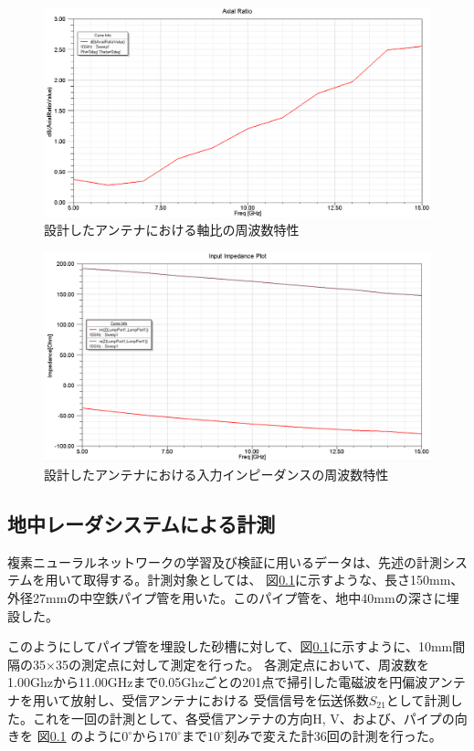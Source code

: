 \documentclass[11pt,a4paper,uplatex,draft]{ujarticle}
\begin{document}
  \begin{figure}[hbtp]
    \centering
    \includegraphics[keepaspectratio, width=130mm]{Images/axial_ratio.png}
    \caption{設計したアンテナにおける軸比の周波数特性}
    \label{fig:axial_ratio}
  \end{figure}

  \begin{figure}[hbtp]
    \centering
    \includegraphics[keepaspectratio, width=130mm]{Images/spiral_impedance.png}
    \caption{設計したアンテナにおける入力インピーダンスの周波数特性}
    \label{fig:spiral_antenna_impedance}
  \end{figure}

\newpage

  \subsection{地中レーダシステムによる計測}
  複素ニューラルネットワークの学習及び検証に用いるデータは、先述の計測システムを用いて取得する。計測対象としては、
  図\ref{}に示すような、長さ150mm、外径27mmの中空鉄パイプ管を用いた。このパイプ管を、地中40mmの深さに埋設した。

  このようにしてパイプ管を埋設した砂槽に対して、図\ref{}に示すように、10mm間隔の35×35の測定点に対して測定を行った。
  各測定点において、周波数を1.00Ghzから11.00GHzまで0.05Ghzごとの201点で掃引した電磁波を円偏波アンテナを用いて放射し、受信アンテナにおける
  受信信号を伝送係数$S_{21}$として計測した。これを一回の計測として、各受信アンテナの方向H, V、および、パイプの向きを
  図\ref{}%
  のように$0^{\circ}$から$170^{\circ}$まで$10^{\circ}$刻みで変えた計36回の計測を行った。
\end{document}
